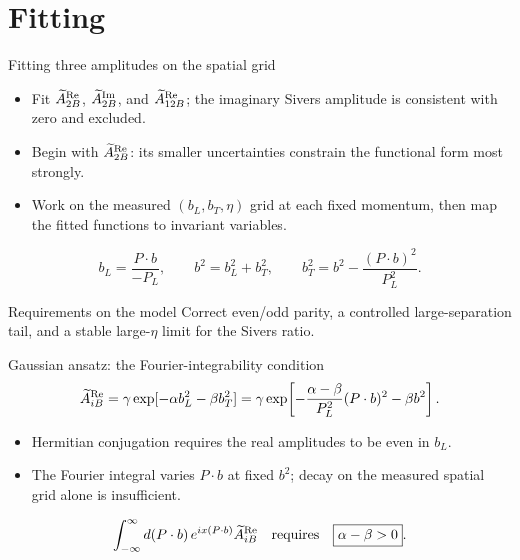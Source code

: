 \section{Fitting}

\begin{frame}{Fitting three amplitudes on the spatial grid}
\begin{itemize}
\item Fit $\widetilde{A}_{2B}^{\text{Re}}$, $\widetilde{A}_{2B}^{\text{Im}}$, and $\widetilde{A}_{12B}^{\text{Re}}$; the imaginary Sivers amplitude is consistent with zero and excluded.
\item Begin with $\widetilde{A}_{2B}^{\text{Re}}$: its smaller uncertainties constrain the functional form most strongly.
\item Work on the measured $(b_L,b_T,\eta)$ grid at each fixed momentum, then map the fitted functions to invariant variables.
\end{itemize}
\[
 b_L=\frac{P\cdot b}{-P_L},\qquad b^2=b_L^2+b_T^2,\qquad
 b_T^2=b^2-\frac{(P\cdot b)^2}{P_L^2}.
\]
\begin{block}{Requirements on the model}
Correct even/odd parity, a controlled large-separation tail, and a stable large-$\eta$ limit for the Sivers ratio.
\end{block}
\end{frame}

\begin{frame}{Gaussian ansatz: the Fourier-integrability condition}
\[
\widetilde{A}_{iB}^{\text{Re}}=\gamma\exp[-\alpha b_L^2-\beta b_T^2]
=\gamma\exp\!\left[-\frac{\alpha-\beta}{P_L^2}(P\cdot b)^2-\beta b^2\right].
\]
\begin{itemize}
\item Hermitian conjugation requires the real amplitudes to be even in $b_L$.
\item The Fourier integral varies $P\cdot b$ at fixed $b^2$; decay on the measured spatial grid alone is insufficient.
\end{itemize}
\[
\int_{-\infty}^{\infty}d(P\cdot b)\,e^{ix(P\cdot b)}\widetilde{A}_{iB}^{\text{Re}}
\quad\text{requires}\quad\boxed{\alpha-\beta>0}.
\]
\end{frame}

